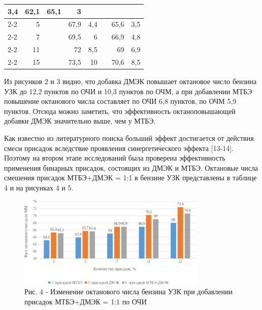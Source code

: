 \begin{table}[H]
{\begin{tabular}{|l|r|rrr|rrr|}
  3,4 &
  \multicolumn{1}{r|}{\multirow{5}{*}{62,1}} &
  \multicolumn{1}{r|}{65,1} &
  3 \\ \cline{2-2} \cline{4-5} \cline{7-8} 
 &
  5 &
  \multicolumn{1}{r|}{} &
  \multicolumn{1}{r|}{67,9} &
  4,4 &
  \multicolumn{1}{r|}{} &
  \multicolumn{1}{r|}{65,6} &
  3,5 \\ \cline{2-2} \cline{4-5} \cline{7-8} 
 &
  7 &
  \multicolumn{1}{r|}{} &
  \multicolumn{1}{r|}{69,5} &
  6 &
  \multicolumn{1}{r|}{} &
  \multicolumn{1}{r|}{66,9} &
  4,8 \\ \cline{2-2} \cline{4-5} \cline{7-8} 
 &
  11 &
  \multicolumn{1}{r|}{} &
  \multicolumn{1}{r|}{72} &
  8,5 &
  \multicolumn{1}{r|}{} &
  \multicolumn{1}{r|}{69} &
  6,9 \\ \cline{2-2} \cline{4-5} \cline{7-8} 
 &
  15 &
  \multicolumn{1}{r|}{} &
  \multicolumn{1}{r|}{73,5} &
  10 &
  \multicolumn{1}{r|}{} &
  \multicolumn{1}{r|}{70,6} &
  8,5 \\ \hline
\end{tabular}
}
\end{table}

\begin{multicols}{2}
Из рисунков 2 и 3 видно, что добавка ДМЭК повышает октановое число
бензина УЗК до 12,2 пунктов по ОЧИ и 10,3 пунктов по ОЧМ, а при
добавлении МТБЭ повышение октанового числа составляет по ОЧИ 6,8
пунктов, по ОЧМ 5,9 пунктов. Отсюда можно заметить, что эффективность
октаноповышающей добавки ДМЭК значительно выше, чем у МТБЭ.

Как известно из литературного поиска больший эффект достигается от
действия смеси при­садок вследствие проявления синергетического эф­фекта
{[}13-14{]}. Поэтому на втором этапе исследований была проверена
эффективность применения бинарных присадок, состоящих из ДМЭК и МТБЭ.
Октановые числа смешения присадок МТБЭ+ДМЭК = 1:1 в бензине УЗК
представлены в таблице 4 и на рисунках 4 и 5.
\end{multicols}

\begin{figure}[H]
	\centering
	\includegraphics[width=0.8\textwidth]{media/chem/image100}
	\caption*{Рис. 4 - Изменение октанового числа бензина УЗК при добавлении
присадок МТБЭ+ДМЭК = 1:1 по ОЧИ}
\end{figure}

